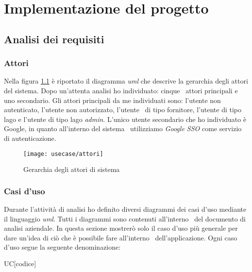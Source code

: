 
\chapter{Implementazione del progetto}
\label{cap:implementazione}
\section{Analisi dei requisiti}

\subsection{Attori}
Nella figura \ref{fig:attori} è riportato il diagramma \emph{\acrshort{uml}} che descrive la gerarchia degli attori del sistema. Dopo un'attenta analisi ho individuato: cinque \
attori principali e uno secondario. Gli attori principali da me individuati sono: l'utente non autenticato, l'utente non autorizzato, l'utente \
di tipo fornitore, l'utente di tipo lago e l'utente di tipo lago \emph{admin}. L'unico utente secondario che ho individuato è Google, in quanto all'interno del sistema \
utilizziamo \emph{Google SSO} come servizio di autenticazione. 

\begin{figure}[!ht]
  \begin{center}
    \texttt{[image: usecase/attori]}
    \caption{Gerarchia degli attori di sistema}
    \label{fig:attori}
  \end{center}
\end{figure}

\subsection{Casi d'uso}
Durante l'attività di analisi ho definito diversi diagrammi dei casi d'uso mediante il linguaggio \emph{\acrshort{uml}}. Tutti i diagrammi sono contenuti all'interno \
del documento di analisi aziendale. In questa sezione mostrerò solo il caso d'uso più generale per dare un'idea di ciò che è possibile fare all'interno \
dell'applicazione. Ogni caso d'uso segue la seguente denominazione:

\begin{center}
  UC[codice]
\end{center}

